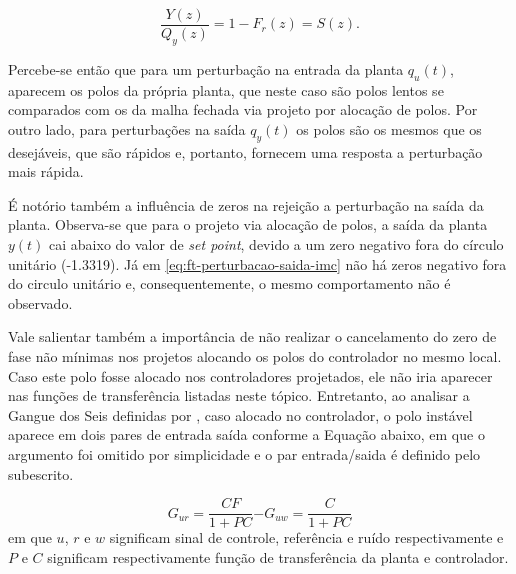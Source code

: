\begin{equation}
    \label{eq:ft-perturbacao-saida-imc}
    \frac{Y(z)}{Q_y(z)} = 1-F_r(z) = S(z).
\end{equation}

Percebe-se então que para um perturbação na entrada da planta $q_u(t)$, aparecem
os polos da própria planta, que neste caso são polos lentos se comparados com os
da malha fechada via projeto por alocação de polos. Por outro lado, para
perturbações na saída $q_y(t)$ os polos são os mesmos que os desejáveis, que são
rápidos e, portanto, fornecem uma resposta a perturbação mais rápida. 

É notório também a influência de zeros na rejeição a perturbação na saída da
planta. Observa-se que para o projeto via alocação de polos, a saída da planta
$y(t)$ cai abaixo do valor de \textit{set point}, devido a um zero negativo fora
do círculo unitário (-1.3319). Já em \ref{eq:ft-perturbacao-saida-imc} não há
zeros negativo fora do circulo unitário e, consequentemente, o mesmo
comportamento não é observado.

Vale salientar também a importância de não realizar o cancelamento do zero de
fase não mínimas nos projetos alocando os polos do controlador no mesmo local.
Caso este polo fosse alocado nos controladores projetados, ele não iria aparecer
nas funções de transferência listadas neste tópico. Entretanto, ao analisar a
Gangue dos Seis definidas por \cite{Astrom2008}, caso alocado no controlador, o
polo instável aparece em dois pares de entrada saída conforme a Equação abaixo,
em que o argumento foi omitido por simplicidade e o par entrada/saida é definido
pelo subescrito.

\begin{subequations}
    \begin{equation}
        G_{ur} = \frac{CF}{1+PC}
    \end{equation}
    \begin{equation}
        -G_{uw} = \frac{C}{1+PC}
    \end{equation}
\end{subequations} em que $u$, $r$ e $w$ significam sinal de controle,
referência e ruído respectivamente e $P$ e $C$ significam respectivamente função
de transferência da planta e controlador.
